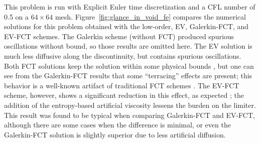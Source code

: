 This problem is run with Explicit Euler time discretization and a CFL
number of 0.5 on a $64\times64$ mesh. Figure~\ref{fig:glance_in_void_fe}
compares the numerical solutions for this problem obtained with the
low-order, EV, Galerkin-FCT, and EV-FCT schemes. The Galerkin scheme
(without FCT) produced spurious oscillations without bound, so those
results are omitted here. The EV solution is much less diffusive along
the discontinuity, but contains spurious oscillations. Both FCT solutions
keep the solution within some physical bounds , but one can see from
the Galerkin-FCT results that some ``terracing'' effects are present; this
behavior is a well-known artifact of traditional FCT schemes \cite{kuzmin_FCT}.
The EV-FCT scheme, however, shows a significant reduction in this effect,
as expected ; the addition of the entropy-based artificial viscosity
lessens the burden on the limiter. This result was found to be typical
when comparing Galerkin-FCT and EV-FCT, although there are some cases
when the difference is minimal, or even the Galerkin-FCT solution is slightly
superior due to less artificial diffusion. 

